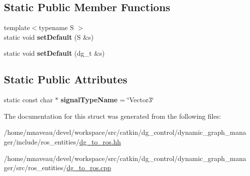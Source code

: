 \subsection*{Static Public Member Functions}
\begin{DoxyCompactItemize}
\item 
{\footnotesize template$<$typename S $>$ }\\static void {\bfseries set\+Default} (S \&s)\hypertarget{structdynamic__graph_1_1DgToRos_3_01specific_1_1Vector3_01_4_ad30846fa87d3c3fd7d4dd8e25a6b942c}{}\label{structdynamic__graph_1_1DgToRos_3_01specific_1_1Vector3_01_4_ad30846fa87d3c3fd7d4dd8e25a6b942c}

\item 
static void {\bfseries set\+Default} (dg\+\_\+t \&s)\hypertarget{structdynamic__graph_1_1DgToRos_3_01specific_1_1Vector3_01_4_a8b63a4aa41ef13891faf99e680f2526c}{}\label{structdynamic__graph_1_1DgToRos_3_01specific_1_1Vector3_01_4_a8b63a4aa41ef13891faf99e680f2526c}

\end{DoxyCompactItemize}
\subsection*{Static Public Attributes}
\begin{DoxyCompactItemize}
\item 
static const char $\ast$ {\bfseries signal\+Type\+Name} = \char`\"{}Vector3\char`\"{}\hypertarget{structdynamic__graph_1_1DgToRos_3_01specific_1_1Vector3_01_4_af9a61a47ac6c3a4f86f94227247293b1}{}\label{structdynamic__graph_1_1DgToRos_3_01specific_1_1Vector3_01_4_af9a61a47ac6c3a4f86f94227247293b1}

\end{DoxyCompactItemize}


The documentation for this struct was generated from the following files\+:\begin{DoxyCompactItemize}
\item 
/home/mnaveau/devel/workspace/src/catkin/dg\+\_\+control/dynamic\+\_\+graph\+\_\+manager/include/ros\+\_\+entities/\hyperlink{dg__to__ros_8hh}{dg\+\_\+to\+\_\+ros.\+hh}\item 
/home/mnaveau/devel/workspace/src/catkin/dg\+\_\+control/dynamic\+\_\+graph\+\_\+manager/src/ros\+\_\+entities/\hyperlink{dg__to__ros_8cpp}{dg\+\_\+to\+\_\+ros.\+cpp}\end{DoxyCompactItemize}
